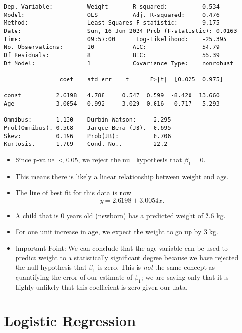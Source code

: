 \documentclass{article}
\theoremstyle{definition}
\theoremstyle{theorem}
\theoremstyle{theorem}
\theoremstyle{theorem}
\theoremstyle{theorem}
\theoremstyle{definition}
\theoremstyle{definition}
\theoremstyle{definition}
\theoremstyle{definition}
\theoremstyle{definition}
\begin{document}
\begin{lstlisting}
Dep. Variable:          Weight       R-squared:          0.534
Model:                  OLS          Adj. R-squared:     0.476
Method:                 Least Squares F-statistic:       9.175
Date:                   Sun, 16 Jun 2024 Prob (F-statistic): 0.0163
Time:                   09:57:00      Log-Likelihood:    -25.395
No. Observations:       10           AIC:                54.79
Df Residuals:           8            BIC:                55.39
Df Model:               1            Covariance Type:    nonrobust

                coef    std err    t      P>|t|  [0.025  0.975]
----------------------------------------------------------------
const          2.6198   4.788     0.547  0.599  -8.420  13.660
Age            3.0054   0.992     3.029  0.016   0.717   5.293

Omnibus:       1.130    Durbin-Watson:     2.295
Prob(Omnibus): 0.568    Jarque-Bera (JB):  0.695
Skew:          0.196    Prob(JB):          0.706
Kurtosis:      1.769    Cond. No.:         22.2
\end{lstlisting}

\begin{itemize}
  \item Since p-value $< 0.05$, we reject the null hypothesis that  $\beta_1 = 0$.
  \item This means there is likely a linear relationship between weight and age.
  \item  The line of best fit for this data is now $$ y = 2.6198 + 3.0054 x.  $$
    \item A child that is 0 years old (newborn) has a predicted weight of 2.6 kg.
    \item For one unit increase in age, we expect the weight to go up by 3 kg.
    \item Important Point: We can conclude that the age variable can be used to predict weight to a statistically significant degree because we have rejected the null hypothesis that $\beta_1$ is zero.  This is \textit{not} the same concept as quantifying the error of our estimate of $\beta_1$; we are saying only that it is highly unlikely that this coefficient is zero given our data.
\end{itemize}



\section{Logistic Regression}
\end{document}
